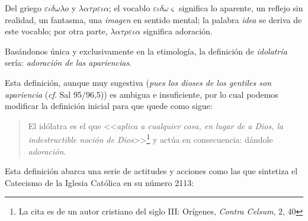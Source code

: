 \documentclass{article}
\begin{document}
Del griego $\varepsilon\iota\delta\omega\lambda o$ y $\lambda\alpha\tau\rho\varepsilon\iota\alpha$; el vocablo $\varepsilon\iota\delta\omega\varsigma$ significa lo aparente, un reflejo sin realidad, un fantasma, una \emph{imagen} en sentido mental; la palabra \emph{idea} se deriva de este vocablo; por otra parte, $\lambda\alpha\tau\rho\varepsilon\iota\alpha$ significa adoraci\'on.

Bas\'andonos \'unica y exclusivamente en la etimolog\'{i}a, la definici\'on de \emph{idolatr\'{i}a} ser\'{i}a: \emph{adoraci\'on de las apariencias}.

Esta definición, aunque muy sugestiva (\emph{pues los dioses de los gentiles son apariencia} (\emph{cf}. Sal 95/96,5)) es ambigua e insuficiente, por lo cual podemos modificar la definici\'on inicial para que quede como sigue:


\begin{quote}
El idólatra es el que <<\emph{aplica a cualquier cosa, en lugar de a Dios, la indestructible noción de Dios}>>\footnote{La cita es de un autor cristiano del siglo III: Orígenes, \emph{Contra Celsum}, 2, 40} y act\'ua en consecuencia: d\'andole \emph{adoraci\'on}.
\end{quote}

\noindent
Esta definici\'on abarca una serie de actitudes y acciones como las que sintetiza el Catecismo de la Iglesia Cat\'olica en su n\'umero 2113:
\end{document}
